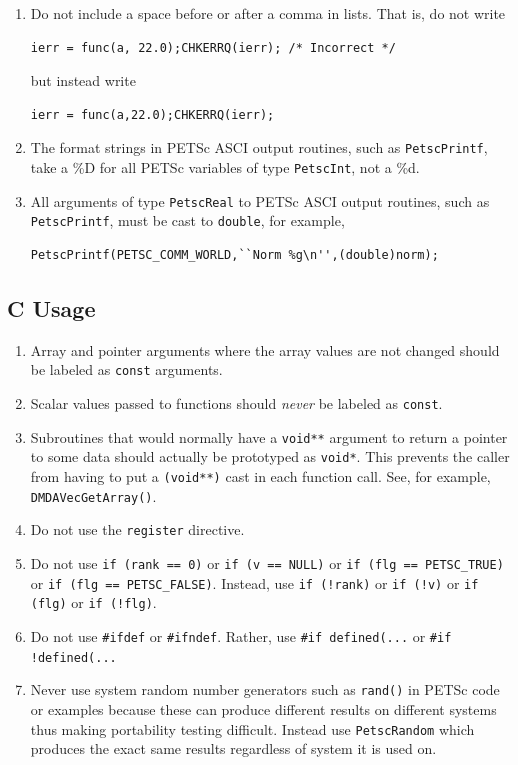 \begin{enumerate}
\item Do not include a  space before or after a comma in lists.
That is, do not write
\begin{lstlisting}
ierr = func(a, 22.0);CHKERRQ(ierr); /* Incorrect */
\end{lstlisting}
but instead write
\begin{lstlisting}
ierr = func(a,22.0);CHKERRQ(ierr);
\end{lstlisting}
\item The format strings in PETSc ASCI output routines, such as \lstinline{PetscPrintf}, take a \%D for all PETSc variables of
type \lstinline{PetscInt}, not a \%d.
\item All arguments of type \lstinline{PetscReal} to PETSc ASCI output routines, such as \lstinline{PetscPrintf}, must be cast to \lstinline{double}, for example,
\begin{lstlisting}
PetscPrintf(PETSC_COMM_WORLD,``Norm %g\n'',(double)norm);
\end{lstlisting}
\end{enumerate}


\subsection{C Usage}
\begin{enumerate}
\item Array and pointer arguments where the array values are not changed should be labeled as \lstinline{const} arguments.
\item Scalar values passed to functions should {\em never} be labeled as \lstinline{const}.
\item Subroutines that would normally have a \lstinline{void**} argument to return a pointer to some data should
actually be prototyped as \lstinline{void*}. This prevents the caller from having to put a \lstinline{(void**)} cast in each function call. See, for example, \lstinline{DMDAVecGetArray()}.
\item Do not use the \lstinline{register} directive.
\item Do not use \lstinline{if (rank == 0)} or \lstinline{if (v == NULL)} or \lstinline{if (flg == PETSC_TRUE)} or \lstinline{if (flg == PETSC_FALSE)}.
Instead, use \lstinline{if (!rank)} or \lstinline{if (!v)} or \lstinline{if (flg)} or \lstinline{if (!flg)}.
\item Do not use \lstinline{#ifdef} or \lstinline{#ifndef}. Rather, use \lstinline{#if defined(...} or \lstinline{#if !defined(...}
\item Never use system random number generators such as \lstinline{rand()} in PETSc code or examples because these can produce different results
on different systems thus making portability testing difficult. Instead use \lstinline{PetscRandom} which produces the exact same results regardless of
system it is used on.
\end{enumerate}

